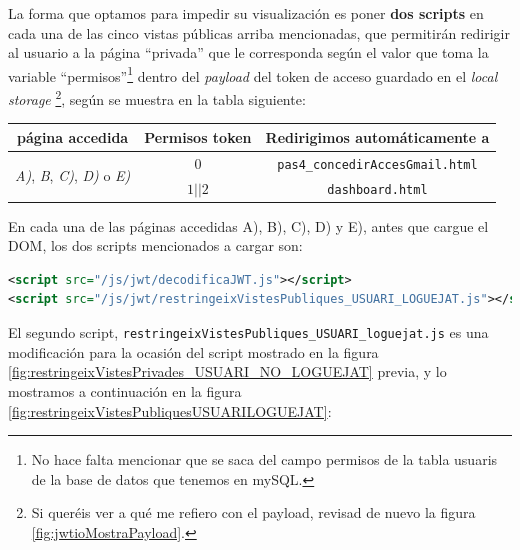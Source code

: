 \documentclass[a4paper,12pt]{report}
\begin{document}
	La forma que optamos para impedir su visualización es poner \textbf{dos scripts} en cada una de las cinco vistas públicas arriba mencionadas, que permitirán redirigir al usuario a la página ``privada'' que le corresponda según el valor que toma la variable ``permisos''\footnote{No hace falta mencionar que se saca del campo permisos de la tabla usuaris de la base de datos que tenemos en mySQL.} dentro del \textit{payload} del token de acceso guardado en el \textit{local storage} \footnote{Si queréis ver a qué me refiero con el payload, revisad de nuevo la figura \ref{fig:jwtioMostraPayload}.}, según se muestra en la tabla siguiente:
		
	\begin{table}[h!]
		\centering
		\begin{tabular}{|c|c|c|}
			\hline
			\textbf{página accedida} & \textbf{Permisos token} & \textbf{Redirigimos automáticamente a} \\
			\hline
			\multirow{2}{*}{\textit{A)}, \textit{B}, \textit{C)}, \textit{D)} o \textit{E)}} & $0$ & \texttt{pas4\_concedirAccesGmail.html} \\
			& $1 || 2$ & \texttt{dashboard.html} \\
			\hline
		\end{tabular}
	\end{table}

	En cada una de las páginas accedidas A), B), C), D) y E), antes que cargue el DOM, los dos scripts mencionados a cargar son:
	
\begin{lstlisting}[language=xml, basicstyle=\ttfamily\footnotesize, keywordstyle=\color{magenta}]
<script src="/js/jwt/decodificaJWT.js"></script>
<script src="/js/jwt/restringeixVistesPubliques_USUARI_LOGUEJAT.js"></script>
\end{lstlisting}

El segundo script, \texttt{restringeixVistesPubliques\_USUARI\_loguejat.js} es una modificación para la ocasión del script mostrado en la figura \ref{fig:restringeixVistesPrivades_USUARI_NO_LOGUEJAT} previa, y lo mostramos a continuación en la figura \ref{fig:restringeixVistesPubliquesUSUARILOGUEJAT}:
\end{document}
